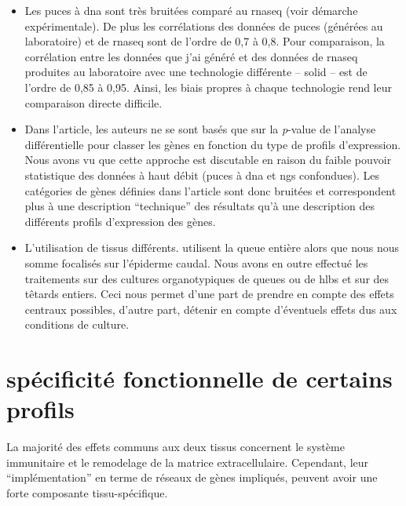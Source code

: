 \documentclass[../main.tex]{subfiles}
\begin{document}
	\begin{itemize}
		\item
			Les puces à \gls{dna} sont très bruitées comparé au \gls{rnaseq} (voir démarche expérimentale).
			De plus les corrélations des données de puces (générées au laboratoire) et de \gls{rnaseq} sont de l'ordre de 0,7 à 0,8.
			Pour comparaison, la corrélation entre les données que j'ai généré et des données de \gls{rnaseq} produites au laboratoire avec une technologie différente – \gls{solid} – est de l'ordre de 0,85 à 0,95.
			Ainsi, les biais propres à chaque technologie rend leur comparaison directe difficile.
		\item
			Dans l'article, les auteurs ne se sont basés que sur la \textit{p}-value de l'analyse différentielle pour classer les gènes en fonction du type de profils d'expression.
			Nous avons vu que cette approche est discutable en raison du faible pouvoir statistique des données à haut débit (puces à \gls{dna} et \gls{ngs} confondues).
			Les catégories de gènes définies dans l'article sont donc bruitées et correspondent plus à une description ``technique'' des résultats qu'à une description des différents profils d'expression des gènes.
		\item
			L'utilisation de tissus différents.
			\citep{Kulkarni2011} utilisent la queue entière alors que nous nous somme focalisés sur l'épiderme caudal.
			Nous avons en outre effectué les traitements sur des cultures organotypiques de queues ou de \glspl{hlb} et sur des têtards entiers.
			Ceci nous permet d'une part de prendre en compte des effets centraux possibles, d'autre part, détenir en compte d'éventuels effets dus aux conditions de culture.
	\end{itemize}


\section{spécificité fonctionnelle de certains profils}

	La majorité des effets communs aux deux tissus concernent le système immunitaire et le remodelage de la matrice extracellulaire.
	Cependant, leur ``implémentation'' en terme de réseaux de gènes impliqués, peuvent avoir une forte composante tissu-spécifique.
\end{document}
